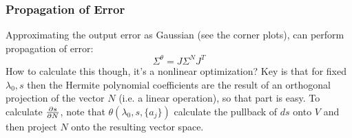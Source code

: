 \documentclass{beamer}
\begin{document}
\begin{frame}
	\frametitle{Propagation of Error}
	Approximating the output error as Gaussian (see the corner plots), can perform propagation of error:
	\begin{equation}
	\Sigma^\theta = J \Sigma^N J^T
	\end{equation}
	How to calculate this though, it's a nonlinear optimization? Key is that for fixed \(\lambda_0, s\) then the Hermite polynomial coefficients are the result of an orthogonal projection of the vector \(N\) (i.e. a linear operation), so that part is easy. To calculate \(\pdv{s}{N}\), note that \(\theta(\lambda_0,s, \{a_j\})\) calculate the pullback of \(ds\) onto \(V\) and then project \(N\) onto the resulting vector space.
\end{frame}
\end{document}

